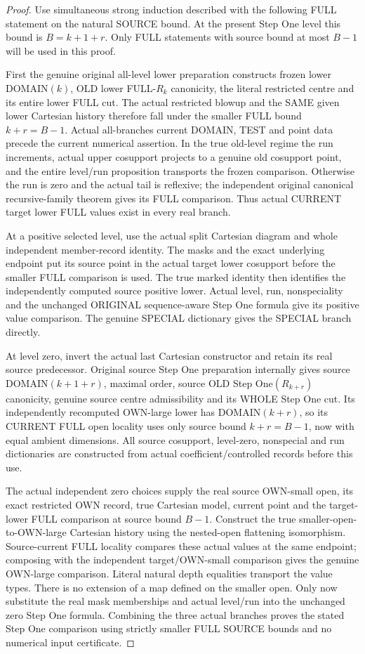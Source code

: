 \begin{proof}
Use simultaneous strong induction described with the following FULL
statement on the natural SOURCE bound. At the present Step One level
this bound is $B=k+1+r$. Only FULL statements with source bound at most
$B-1$ will be used in this proof.

First the genuine original all-level lower preparation constructs
frozen lower DOMAIN$(k)$, OLD lower FULL-$R_k$ canonicity, the literal
restricted centre and its entire lower FULL cut. The actual restricted
blowup and the SAME given lower Cartesian history therefore fall under
the smaller FULL bound $k+r=B-1$. Actual all-branches current DOMAIN,
TEST and point data precede the current numerical assertion. In the
true old-level regime the run increments, actual upper cosupport
projects to a genuine old cosupport point, and the entire level/run
proposition transports the frozen comparison. Otherwise the run is
zero and the actual tail is reflexive; the independent original
canonical recursive-family theorem gives its FULL comparison. Thus
actual CURRENT target lower FULL values exist in every real branch.

At a positive selected level, use the actual split Cartesian diagram
and whole independent member-record identity. The masks and the exact
underlying endpoint put its source point in the actual target lower
cosupport before the smaller FULL comparison is used. The true marked
identity then identifies the independently computed source positive
lower. Actual level, run, nonspeciality and the unchanged ORIGINAL
sequence-aware Step One formula give its positive value comparison.
The genuine SPECIAL dictionary gives the SPECIAL branch directly.

At level zero, invert the actual last Cartesian constructor and retain
its real source predecessor. Original source Step One preparation
internally gives source DOMAIN$(k+1+r)$, maximal order, source OLD
Step One$(R_{k+r})$ canonicity, genuine source centre admissibility
and its WHOLE Step One cut. Its independently recomputed OWN-large
lower has DOMAIN$(k+r)$, so its CURRENT FULL open locality uses only
source bound $k+r=B-1$, now with equal ambient dimensions. All source
cosupport, level-zero, nonspecial and run dictionaries are constructed
from actual coefficient/controlled records before this use.

The actual independent zero choices supply the real source OWN-small
open, its exact restricted OWN record, true Cartesian model, current
point and the target-lower FULL comparison at source bound $B-1$.
Construct the true smaller-open-to-OWN-large Cartesian history using
the nested-open flattening isomorphism. Source-current FULL locality
compares these actual values at the same endpoint; composing with the
independent target/OWN-small comparison gives the genuine OWN-large
comparison. Literal natural depth equalities transport the value types.
There is no extension of a map defined on the smaller open. Only now
substitute the real mask memberships and actual level/run into the
unchanged zero Step One formula. Combining the three actual branches
proves the stated Step One comparison using strictly smaller FULL
SOURCE bounds and no numerical input certificate.
\end{proof}


